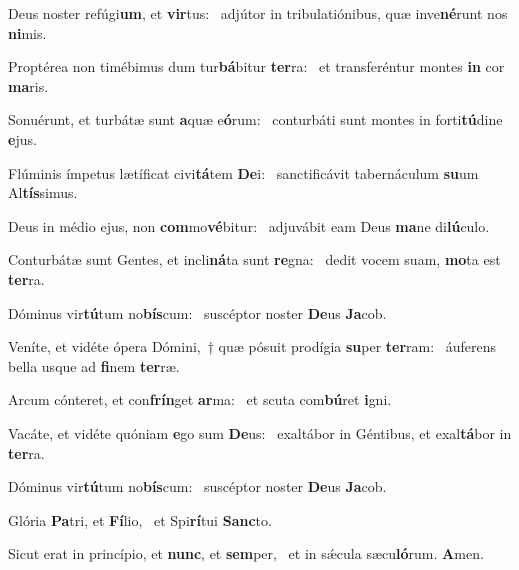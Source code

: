 \item Deus noster refúgi\textbf{um}, et \textbf{vir}tus:~\psstar{} adjútor in tribulatiónibus, quæ inve\textbf{né}runt nos \textbf{ni}mis.
\item Proptérea non timébimus dum tur\textbf{bá}bitur \textbf{ter}ra:~\psstar{} et transferéntur montes \textbf{in} cor \textbf{ma}ris.
\item Sonuérunt, et turbátæ sunt \textbf{a}quæ e\textbf{ó}rum:~\psstar{} conturbáti sunt montes in forti\textbf{tú}dine \textbf{e}jus.
\item Flúminis ímpetus lætíficat civi\textbf{tá}tem \textbf{De}i:~\psstar{} sanctificávit tabernáculum \textbf{su}um Al\textbf{tís}simus.
\item Deus in médio ejus, non \textbf{com}mo\textbf{vé}bitur:~\psstar{} adjuvábit eam Deus \textbf{ma}ne di\textbf{lú}culo.
\item Conturbátæ sunt Gentes, et incli\textbf{ná}ta sunt \textbf{re}gna:~\psstar{} dedit vocem suam, \textbf{mo}ta est \textbf{ter}ra.
\item Dóminus vir\textbf{tú}tum no\textbf{bís}\-cum:~\psstar{} suscéptor noster \textbf{De}us \textbf{Ja}cob.
\item Veníte, et vidéte ópera Dómini,~† quæ pósuit prodígia \textbf{su}per \textbf{ter}ram:~\psstar{} áuferens bella usque ad \textbf{fi}nem \textbf{ter}ræ.
\item Arcum cónteret, et con\textbf{frín}get \textbf{ar}ma:~\psstar{} et scuta com\textbf{bú}ret \textbf{i}gni.
\item Vacáte, et vidéte quóniam \textbf{e}go sum \textbf{De}us:~\psstar{} exaltábor in Géntibus, et exal\textbf{tá}bor in \textbf{ter}ra.
\item Dóminus vir\textbf{tú}tum no\textbf{bís}\-cum:~\psstar{} suscéptor noster \textbf{De}us \textbf{Ja}cob.
\item Glória \textbf{Pa}tri, et \textbf{Fí}lio,~\psstar{} et Spi\textbf{rí}tui \textbf{Sanc}to.
\item Sicut erat in princípio, et \textbf{nunc}, et \textbf{sem}per,~\psstar{} et in sǽcula sæcu\textbf{ló}rum. \textbf{A}men.
